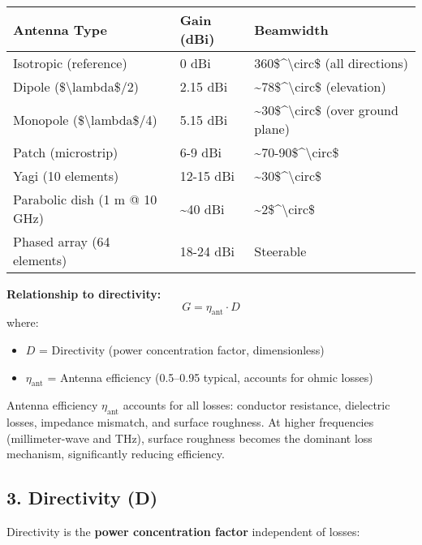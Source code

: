 {\def\LTcaptype{} %
\begin{longtable}[]{@{}lll@{}}
\toprule\noalign{}
Antenna Type & Gain (dBi) & Beamwidth \\
\midrule\noalign{}
\endhead
\bottomrule\noalign{}
\endlastfoot
Isotropic (reference) & 0 dBi & 360\$\^{}\textbackslash circ\$ (all
directions) \\
Dipole (\$\textbackslash lambda\$/2) & 2.15 dBi &
\textasciitilde78\$\^{}\textbackslash circ\$ (elevation) \\
Monopole (\$\textbackslash lambda\$/4) & 5.15 dBi &
\textasciitilde30\$\^{}\textbackslash circ\$ (over ground plane) \\
Patch (microstrip) & 6-9 dBi &
\textasciitilde70-90\$\^{}\textbackslash circ\$ \\
Yagi (10 elements) & 12-15 dBi &
\textasciitilde30\$\^{}\textbackslash circ\$ \\
Parabolic dish (1 m @ 10 GHz) & \textasciitilde40 dBi &
\textasciitilde2\$\^{}\textbackslash circ\$ \\
Phased array (64 elements) & 18-24 dBi & Steerable \\
\end{longtable}
}

\textbf{Relationship to directivity:}
\begin{equation}
G = \eta_{\text{ant}} \cdot D
\label{eq:gain-directivity}
\end{equation}
where:
\begin{itemize}
\item $D$ = Directivity (power concentration factor, dimensionless)
\item $\eta_{\text{ant}}$ = Antenna efficiency (0.5--0.95 typical, accounts for ohmic losses)
\end{itemize}

\begin{warningbox}
Antenna efficiency $\eta_{\text{ant}}$ accounts for all losses: conductor resistance, dielectric losses, impedance mismatch, and surface roughness. At higher frequencies (millimeter-wave and THz), surface roughness becomes the dominant loss mechanism, significantly reducing efficiency.
\end{warningbox}

\subsection{3. Directivity (D)}

Directivity is the \textbf{power concentration factor} independent of losses:

